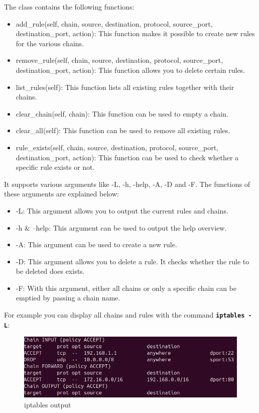 The class contains the following functions:

\begin{itemize}
    \item add\_rule(self, chain, source, destination, protocol, source\_port, destination\_port, action): This function makes it possible to create new rules for the various chains.
    \item remove\_rule(self, chain, source, destination, protocol, source\_port, destination\_port, action): This function allows you to delete certain rules.
    \item list\_rules(self): This function lists all existing rules together with their chains.
    \item clear\_chain(self, chain): This function can be used to empty a chain.
    \item clear\_all(self): This function can be used to remove all existing rules.
    \item rule\_exists(self, chain, source, destination, protocol, source\_port, destination\_port, action): This function can be used to check whether a specific rule exists or not.
\end{itemize}

It supports various arguments like -L, -h, -help, -A, -D and -F. The functions of these arguments are explained below:

\begin{itemize}
    \item -L: This argument allows you to output the current rules and chains.
    \item -h \& –help: This argument can be used to output the help overview.
    \item -A: This argument can be used to create a new rule.
    \item -D: This argument allows you to delete a rule. It checks whether the rule to be deleted does exists.
    \item -F: With this argument, either all chains or only a specific chain can be emptied by passing a chain name.
\end{itemize}

For example you can display all chains and rules with the command \textbf{\texttt{iptables -L}}:

\begin{figure}[H]
    \centering
    \includegraphics[width=1\linewidth]{bilder/output-iptables.PNG}
    \caption{iptables output}
\end{figure}

